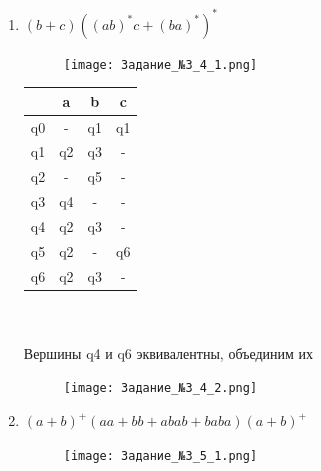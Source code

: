 \documentclass[a4paper]{article}
\begin{document}
\begin{enumerate}
\item $(b+c)((ab)^*c+(ba)^*)^*$\\
\begin{figure}[h]
\centering
\texttt{[image: Задание\_№3\_4\_1.png]}
\end{figure}

\begin{tabular}{|*{4}{c|}}
\textbf{ } & a & b & c\\
\hline\hline
q0 & - & q1 & q1 \\
\hline\hline
q1 & q2 & q3 & - \\
\hline\hline
q2 & - & q5 & - \\
\hline\hline
q3 & q4 & - & - \\
\hline\hline
q4 & q2 & q3 & - \\
\hline\hline
q5 & q2 & - & q6 \\
\hline\hline
q6 & q2 & q3 & - \\
\end{tabular}
\\

\\Вершины q4 и q6 эквивалентны, объединим их\\
\begin{figure}[h]
\centering
\texttt{[image: Задание\_№3\_4\_2.png]}
\end{figure}


\item $(a+b)^+ (aa+bb+abab+baba)(a+b)^+$\\
\begin{figure}[h]
\centering
\texttt{[image: Задание\_№3\_5\_1.png]}
\end{figure}


\end{enumerate}
\end{document}
